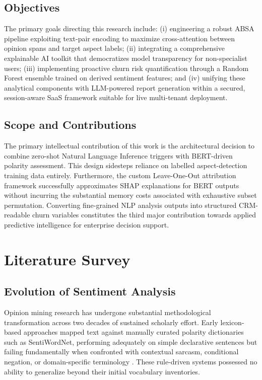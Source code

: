 \documentclass[12pt,a4paper]{report}
\begin{document}
\section{Objectives}
The primary goals directing this research include: (i) engineering a robust ABSA pipeline exploiting text-pair encoding to maximize cross-attention between opinion spans and target aspect labels; (ii) integrating a comprehensive explainable AI toolkit that democratizes model transparency for non-specialist users; (iii) implementing proactive churn risk quantification through a Random Forest ensemble trained on derived sentiment features; and (iv) unifying these analytical components with LLM-powered report generation within a secured, session-aware SaaS framework suitable for live multi-tenant deployment.

\section{Scope and Contributions}
The primary intellectual contribution of this work is the architectural decision to combine zero-shot Natural Language Inference triggers with BERT-driven polarity assessment. This design sidesteps reliance on labelled aspect-detection training data entirely. Furthermore, the custom Leave-One-Out attribution framework successfully approximates SHAP explanations for BERT outputs without incurring the substantial memory costs associated with exhaustive subset permutation. Converting fine-grained NLP analysis outputs into structured CRM-readable churn variables constitutes the third major contribution towards applied predictive intelligence for enterprise decision support.

\chapter{Literature Survey}

\section{Evolution of Sentiment Analysis}
Opinion mining research has undergone substantial methodological transformation across two decades of sustained scholarly effort. Early lexicon-based approaches mapped text against manually curated polarity dictionaries such as SentiWordNet, performing adequately on simple declarative sentences but failing fundamentally when confronted with contextual sarcasm, conditional negation, or domain-specific terminology \cite{baccianella2010sentiwordnet}. These rule-driven systems possessed no ability to generalize beyond their initial vocabulary inventories.
\end{document}
